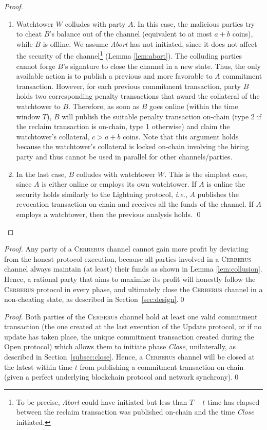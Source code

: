 \documentclass[runningheads]{llncs}
\newcommand{\ie}{{\em i.e.}}
\newcommand{\sys}{\textsc{Cerberus}\xspace}
\begin{document}
\begin{proof}
\begin{enumerate}[label=(\roman*)]
    \item Watchtower $W$ colludes with party $A$.
    In this case, the malicious parties try to cheat $B$'s balance out of the channel (equivalent to at most $a+b$ coins), while $B$ is offline.
    We assume \textit{Abort} has not initiated, since it does not affect the security of the channel\footnote{To be precise, \textit{Abort} could have initiated but less than $T-t$ time has elapsed between the reclaim transaction was published on-chain and the time \textit{Close} initiated.} (Lemma \ref{lem:abort}).
    The colluding parties cannot forge $B$'s signature to close the channel in a new state. Thus, the only available action is to publish a previous and more favorable to $A$ commitment transaction.
    However, for each previous commitment transaction, party $B$ holds two corresponding penalty transactions that award the collateral of the watchtower to $B$. Therefore, as soon as $B$ goes online (within the time window $T$), $B$ will publish the suitable penalty transaction on-chain (type 2 if the reclaim transaction is on-chain, type 1 otherwise) and claim the watchtower's collateral, $c>a+b$ coins.
    Note that this argument holds because the watchtower's collateral is locked on-chain involving the hiring party and thus cannot be used in parallel for other channels/parties.

    \item In the last case, $B$ colludes with watchtower $W$.
    This is the simplest case, since $A$ is either online or employs its own watchtower. If $A$ is online the security holds similarly to the Lightning protocol, \ie, $A$ publishes the revocation transaction on-chain and receives all the funds of the channel. If $A$ employs a watchtower, then the previous analysis holds. \hfill \qed
 \end{enumerate}
\end{proof}


\correctness*
\begin{proof}
Any party of a \sys channel cannot gain more profit by deviating from the honest protocol execution, because all parties involved in a \sys channel always maintain (at least) their funds as shown in Lemma \ref{lem:collusion}. Hence, a rational party that aims to maximize its profit will honestly follow the \sys protocol in every phase, and ultimately close the \sys channel in a non-cheating state, as described in Section~\ref{sec:design}.\hfill \qed
\end{proof}

\time*
\begin{proof}
Both parties of the \sys channel hold at least one valid commitment transaction (the one created at the last execution of the Update protocol, or if no update has taken place, the unique commitment transaction created during the Open protocol) which allows them to initiate phase \textit{Close}, unilaterally, as described in Section~\ref{subsec:close}.
Hence, a \sys channel will be closed at the latest within time $t$ from publishing a commitment transaction on-chain (given a perfect underlying blockchain protocol and network synchrony).\hfill \qed
\end{proof}
\end{document}
